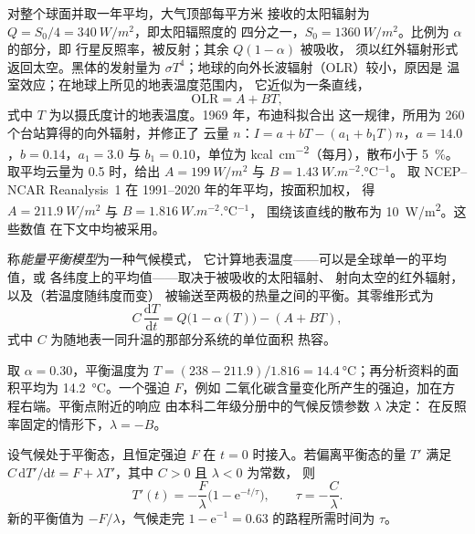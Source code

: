 对整个球面并取一年平均，大气顶部每平方米
接收的太阳辐射为 $Q = S_0/4 = \qty{340}{W/m^2}$，即太阳辐照度的
四分之一，$S_0 = \qty{1360}{W/m^2}$。比例为 $\alpha$ 的部分，即
行星反照率，被反射；其余 $Q(1 - \alpha)$ 被吸收，
须以红外辐射形式返回太空。黑体的发射量为 $\sigma
T^4$；地球的向外长波辐射（OLR）较小，原因是
温室效应；在地球上所见的地表温度范围内，
它近似为一条直线，
\[
\text{OLR} = A + BT ,
\]
式中 $T$ 为以摄氏度计的地表温度。1969 年，布迪科拟合出
这一规律，所用为 260 个台站算得的向外辐射，并修正了
云量 $n$：$I = a + bT - (a_1 + b_1T)n$，$a = 14.0$，$b = 0.14$，$a_1 =
3.0$ 与 $b_1 = 0.10$，单位为 \unit{kcal.cm^{-2}}（每月），散布小于
\qty{5}{\percent}。取平均云量为 0.5 时，给出 $A =
\qty{199}{W/m^2}$ 与 $B = \qty{1.43}{W.m^{-2}.\celsius^{-1}}$。
取 NCEP--NCAR Reanalysis~1 在 1991--2020 年的年平均，按面积加权，
得 $A = \qty{211.9}{W/m^2}$ 与 $B = \qty{1.816}{W.m^{-2}.\celsius^{-1}}$，
围绕该直线的散布为 \qty{10}{W/m^2}。这些数值
在下文中均被采用。

\begin{definition}[能量平衡模型]\label{def:b3:climate-models:ebm}
称\emph{能量平衡模型}为一种气候模式，
它计算地表温度——可以是全球单一的平均值，或
各纬度上的平均值——取决于被吸收的太阳辐射、
射向太空的红外辐射，以及（若温度随纬度而变）
被输送至两极的热量之间的平衡。其零维形式为
\[
C\,\frac{\mathrm dT}{\mathrm dt} = Q\big(1 - \alpha(T)\big) - (A + BT) ,
\]
式中 $C$ 为随地表一同升温的那部分系统的单位面积
热容。
\end{definition}

取 $\alpha = 0.30$，平衡温度为 $T = (238 - 211.9)/1.816 =
\qty{14.4}{\celsius}$；再分析资料的面积平均为
\qty{14.2}{\celsius}。一个强迫 $F$，例如
二氧化碳含量变化所产生的强迫，加在方程右端。平衡点附近的响应
由本科二年级分册中的气候反馈参数 $\lambda$ 决定：
在反照率固定的情形下，$\lambda = -B$。

\begin{theorem}[单箱气候的响应时间]\label{thm:b3:climate-models:response}
设气候处于平衡态，且恒定强迫 $F$ 在
$t = 0$ 时接入。若偏离平衡态的量 $T'$ 满足 $C\,\mathrm
dT'/\mathrm dt = F + \lambda T'$，其中 $C > 0$ 且 $\lambda < 0$ 为常数，
则
\[
T'(t) = -\frac{F}{\lambda}\Big(1 - \mathrm e^{-t/\tau}\Big), \qquad
\tau = -\frac{C}{\lambda} .
\]
新的平衡值为 $-F/\lambda$，气候走完 $1
- \mathrm e^{-1} = \num{0.63}$ 的路程所需时间为 $\tau$。
\end{theorem}

